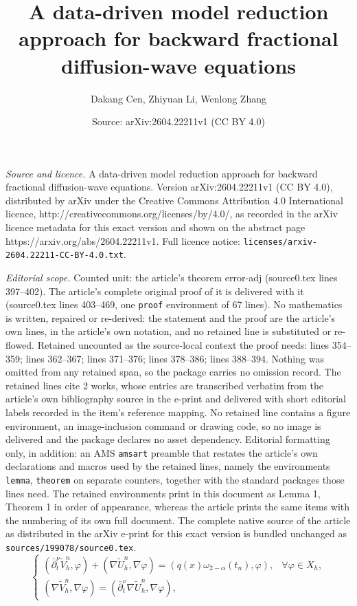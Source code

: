 \documentclass[10pt,a4paper]{amsart}
\title{A data-driven model reduction approach for backward fractional diffusion-wave equations}
\author{Dakang Cen, Zhiyuan Li, Wenlong Zhang}
\date{Source: arXiv:2604.22211v1 (CC BY 4.0)}
\begin{document}
\maketitle

\noindent\emph{Source and licence.} A data-driven model reduction approach for backward fractional diffusion-wave equations. Version arXiv:2604.22211v1 (CC BY 4.0), distributed by arXiv under the Creative Commons Attribution 4.0 International licence, http://creativecommons.org/licenses/by/4.0/, as recorded in the arXiv licence metadata for this exact version and shown on the abstract page https://arxiv.org/abs/2604.22211v1. Full licence notice: \texttt{licenses/arxiv-2604.22211-CC-BY-4.0.txt}.\par\smallskip

\noindent\textit{Editorial scope.} Counted unit: the article's theorem error-adj (source0.tex lines 397--402). The article's complete original proof of it is delivered with it (source0.tex lines 403--469, one \texttt{proof} environment of 67 lines). No mathematics is written, repaired or re-derived: the statement and the proof are the article's own lines, in the article's own notation, and no retained line is substituted or re-flowed.  Retained uncounted as the source-local context the proof needs: lines 354--359; lines 362--367; lines 371--376; lines 378--386; lines 388--394.  Nothing was omitted from any retained span, so the package carries no omission record.  The retained lines cite 2 works, whose entries are transcribed verbatim from the article's own bibliography source in the e-print and delivered with short editorial labels recorded in the item's reference mapping.  No retained line contains a figure environment, an image-inclusion command or drawing code, so no image is delivered and the package declares no asset dependency.  Editorial formatting only, in addition: an AMS \texttt{amsart} preamble that restates the article's own declarations and macros used by the retained lines, namely the environments \texttt{lemma}, \texttt{theorem} on separate counters, together with the standard packages those lines need.  The retained environments print in this document as Lemma 1, Theorem 1 in order of appearance, whereas the article prints the same items with the numbering of its own full document.  The complete native source of the article as distributed in the arXiv e-print for this exact version is bundled unchanged as \texttt{sources/199078/source0.tex}.
\begin{equation}\label{num-scheme-fed}
\begin{cases}
  (\bar\partial_t^\nu \widetilde{V}_h^n,\varphi) + (\nabla \widetilde{U}_h^n,\nabla \varphi) = (q(x)\omega_{2-\alpha}(t_n),\varphi), & \forall \varphi\in X_h, \\
  (\nabla\widetilde{V}_h^n,\nabla\varphi)  = (\bar\partial_t^\nu \nabla\widetilde{U}_h^n,\nabla\varphi),
\end{cases}
\end{equation}
\end{document}
